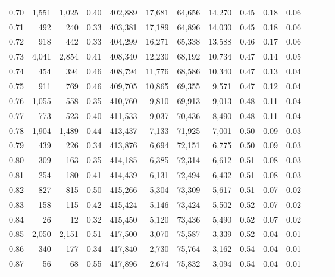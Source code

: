 \begin{tabular}{rrrrrrrrrrrrrr}
0.70 &   1,551 &  1,025 &  0.40 &  402,889 &   17,681 &  64,656 &  14,270 &  0.45 &  0.18 &      0.06 \\
0.71 &     492 &    240 &  0.33 &  403,381 &   17,189 &  64,896 &  14,030 &  0.45 &  0.18 &      0.06 \\
0.72 &     918 &    442 &  0.33 &  404,299 &   16,271 &  65,338 &  13,588 &  0.46 &  0.17 &      0.06 \\
0.73 &   4,041 &  2,854 &  0.41 &  408,340 &   12,230 &  68,192 &  10,734 &  0.47 &  0.14 &      0.05 \\
0.74 &     454 &    394 &  0.46 &  408,794 &   11,776 &  68,586 &  10,340 &  0.47 &  0.13 &      0.04 \\
0.75 &     911 &    769 &  0.46 &  409,705 &   10,865 &  69,355 &   9,571 &  0.47 &  0.12 &      0.04 \\
0.76 &   1,055 &    558 &  0.35 &  410,760 &    9,810 &  69,913 &   9,013 &  0.48 &  0.11 &      0.04 \\
0.77 &     773 &    523 &  0.40 &  411,533 &    9,037 &  70,436 &   8,490 &  0.48 &  0.11 &      0.04 \\
0.78 &   1,904 &  1,489 &  0.44 &  413,437 &    7,133 &  71,925 &   7,001 &  0.50 &  0.09 &      0.03 \\
0.79 &     439 &    226 &  0.34 &  413,876 &    6,694 &  72,151 &   6,775 &  0.50 &  0.09 &      0.03 \\
0.80 &     309 &    163 &  0.35 &  414,185 &    6,385 &  72,314 &   6,612 &  0.51 &  0.08 &      0.03 \\
0.81 &     254 &    180 &  0.41 &  414,439 &    6,131 &  72,494 &   6,432 &  0.51 &  0.08 &      0.03 \\
0.82 &     827 &    815 &  0.50 &  415,266 &    5,304 &  73,309 &   5,617 &  0.51 &  0.07 &      0.02 \\
0.83 &     158 &    115 &  0.42 &  415,424 &    5,146 &  73,424 &   5,502 &  0.52 &  0.07 &      0.02 \\
0.84 &      26 &     12 &  0.32 &  415,450 &    5,120 &  73,436 &   5,490 &  0.52 &  0.07 &      0.02 \\
0.85 &   2,050 &  2,151 &  0.51 &  417,500 &    3,070 &  75,587 &   3,339 &  0.52 &  0.04 &      0.01 \\
0.86 &     340 &    177 &  0.34 &  417,840 &    2,730 &  75,764 &   3,162 &  0.54 &  0.04 &      0.01 \\
0.87 &      56 &     68 &  0.55 &  417,896 &    2,674 &  75,832 &   3,094 &  0.54 &  0.04 &      0.01 \\

\end{tabular}
